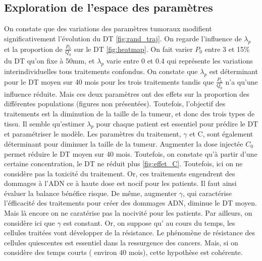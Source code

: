 \documentclass[12pt]{article}
\begin{document}
\subsection{Exploration de l'espace des paramètres}
On constate que des variations des paramètres tumoraux modifient significativement l'évolution du DT \ref{fig:rand_traj}.  On regarde l'influence de $\lambda_{p}$ et  la proportion de $\frac{P_{0}}{Q_{0}}$
sur le DT \ref{fig:heatmap}. On fait varier $P_{0}$ entre 3 et 15\% du DT qu'on fixe à 50mm, et $\lambda_{p}$ varie entre 0 et 0.4 qui représente les variations interindividuelles tous traitements confondus. On constate que $\lambda_{p}$ est déterminant pour le DT moyen sur 40 mois pour les trois traitements tandis que $\frac{P_{0}}{Q_{0}}$ n'a qu'une influence réduite. Mais ces deux paramètres ont des effets sur la proportion des différentes populations (figures non présentées). Toutefois, l'objectif des traitements est la diminution de la taille de la tumeur, et donc des trois types de tissu. Il semble qu'estimer $\lambda_{p}$ pour chaque patient est essentiel pour prédire le DT et paramétriser le modèle. Les paramètres du traitement,  $\gamma$ et C, sont également déterminant pour diminuer la taille de la tumeur. Augmenter la dose injectée $C_{0}$ permet réduire le DT moyen sur 40 mois. Toutefois, on constate qu'à partir d'une certaine concentration, le DT ne réduit plus \ref{fig:effet_C}. Toutefois, ici on ne considère pas la toxicité du traitement.  Or, ces traitements engendrent des dommages à l'ADN ce à haute dose est nocif pour les patients. Il faut ainsi évaluer la balance bénéfice risque. De même, augmenter $\gamma$, qui caractérise l'éfficacité des traitements pour créer des dommages ADN, diminue le DT moyen. Mais là encore on ne caratérise pas la nocivité pour les patients. Par ailleurs, on considère ici que $\gamma$ est constant. Or, on suppose qu' au cours du temps, les cellules traitées vont développer de la résistance. Le phénomène de résistance des cellules quiescentes est essentiel dans la ressurgence des cancers. Mais, si on considère des temps courts ( environ 40 mois), cette hypothèse est cohérente. 
\end{document}
